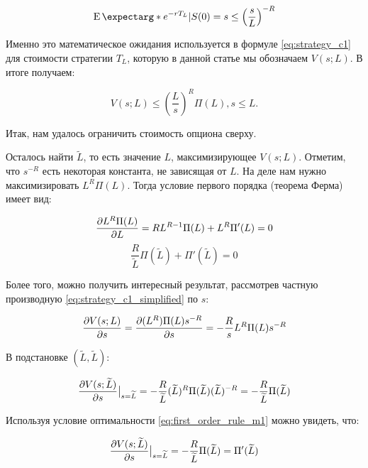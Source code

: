 \documentclass[a4paper,12pt]{article}
\theoremstyle{definition}
\newcommand{\at}[2][]{#1|_{#2}}
\newcommand{\expect}{\operatorname{E}\expectarg}
\begin{document}
\begin{equation*}
    \expect*{e^{-r T_L} | S(0) = s} \le \left(\frac{s}{L}\right)^{-R}
\end{equation*}

Именно это математическое ожидания используется в формуле \eqref{eq:strategy_c1} для стоимости стратегии $T_L$, которую в данной статье мы обозначаем $V(s; L)$. В итоге получаем:

\begin{equation}\label{eq:strategy_c1_simplified}
V(s; L) \le \left(\frac{L}{s}\right)^{R} \Pi(L), s \le L.
\end{equation}

Итак, нам удалось ограничить стоимость опциона сверху.

Осталось найти $\widetilde{L}$, то есть значение $L$, максимизирующее $V(s; L)$. Отметим, что $s^{-R}$ есть некоторая константа, не зависящая от $L$. На деле нам нужно максимизировать $L^{R} \Pi(L)$. Тогда условие первого порядка (теорема Ферма) имеет вид:

\begin{equation*}
    \pdv{L^{R} \Pi(L)}{L} = R L^{R - 1} \Pi(L) + L^R \Pi'(L) = 0
\end{equation*}
\begin{equation}\label{eq:first_order_rule_m1}
    \frac{R}{\widetilde{L}} \Pi(\widetilde{L}) + \Pi'(\widetilde{L}) = 0
\end{equation}

Более того, можно получить интересный результат, рассмотрев частную производную \eqref{eq:strategy_c1_simplified} по $s$:

\begin{equation*}
    \pdv{V(s; L)}{s} = \pdv{(L^R) \Pi(L) s^{-R}}{s} = -\frac{R}{s} L^R \Pi(L) s^{-R}
\end{equation*}

В подстановке $(\widetilde{L}, \widetilde{L})$:

\begin{equation*}
    \pdv{V(s; \widetilde{L})}{s}\at[\big]{s=\widetilde{L}} = -\frac{R}{\widetilde{L}} (\widetilde{L})^R \Pi(\widetilde{L}) (\widetilde{L})^{-R} = -\frac{R}{\widetilde{L}} \Pi(\widetilde{L})
\end{equation*}

Используя условие оптимальности \eqref{eq:first_order_rule_m1} можно увидеть, что:

\begin{equation}\label{eq:smooth_pasting_condition_m1}
    \pdv{V(s; \widetilde{L})}{s}\at[\big]{s=\widetilde{L}} = -\frac{R}{\widetilde{L}} \Pi(\widetilde{L}) = \Pi'(\widetilde{L})
\end{equation}
\end{document}
